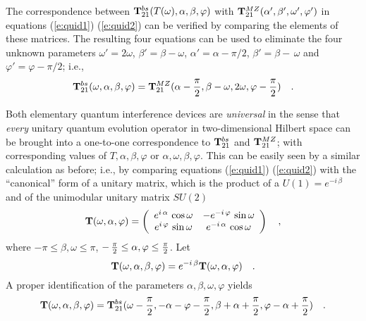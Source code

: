 \documentclass [11pt]{llncs}
\begin{document}
The correspondence between
${\bf T}_{21}^{bs} (T(\omega ),\alpha ,\beta ,\varphi )$ with
${\bf T}_{21}^{MZ} (\alpha ',\beta ',\omega ',\varphi ')$ in equations
(\ref{e:quid1})
(\ref{e:quid2}) can be verified by comparing the elements of these
matrices.
The resulting four equations can be used to eliminate the four unknown
parameters
$\omega '=2\omega $,
$\beta '=\beta -\omega$,
$\alpha '=\alpha -\pi /2$,
$\beta '=\beta -\, \omega$ and
$\varphi '=\varphi -\pi /2$; i.e.,
\begin{equation}
{\bf T}_{21}^{bs} (\omega ,\alpha ,\beta ,\varphi ) =
{\bf T}_{21}^{MZ} (\alpha -{\pi \over 2}, \beta
-\omega ,2\omega
,\varphi
-{\pi \over 2})
\quad .
\end{equation}


Both elementary quantum interference devices are {\em universal} in the
sense that
{\em every} unitary quantum
evolution operator in two-dimensional Hilbert space can be brought into
a one-to-one correspondence to  ${\bf T}^{bs}_{21}$ and
${\bf T}^{MZ}_{21}$; with corresponding values of
$T,\alpha ,\beta ,\varphi$ or
$\alpha ,\omega ,\beta ,\varphi $.
This can be easily seen by a similar calculation as before; i.e., by
comparing
equations
(\ref{e:quid1})
(\ref{e:quid2}) with the ``canonical''  form of a unitary matrix, which
is the product of a $U(1)=e^{-i\,\beta}$ and
 of the unimodular unitary
matrix $SU(2)$ \cite{murnaghan}
\begin{equation}
{\bf T} (\omega ,\alpha ,\varphi )=
\left(
\begin{array}{cc}
{e^{i\,\alpha }}\,\cos \omega
&
{-e^{-i\,\varphi }}\,\sin \omega
\\
{e^{i\,\varphi }}\,\sin \omega
&
{e^{-i\,\alpha }}\,\cos \omega
 \end{array}
\right)
 \quad ,
\end{equation}
where $-\pi \le \beta ,\omega \le \pi$,
$-\, {\pi \over 2} \le  \alpha ,\varphi \le {\pi \over 2}$.
Let
\begin{equation}
{\bf T} (\omega ,\alpha ,\beta ,\varphi )=
e^{-i\,\beta}{\bf T} (\omega ,\alpha ,\varphi )
\quad .
\end{equation}
A proper identification of the parameters
$\alpha ,\beta ,\omega ,\varphi $ yields
\begin{equation}
{\bf T} (\omega ,\alpha ,\beta ,\varphi )=
{\bf T}_{21}^{bs} (\omega -{\pi \over 2} ,-\alpha -\varphi -{\pi \over
2},
\beta + \alpha  +{\pi  \over 2} ,\varphi -\alpha +{\pi \over 2}
)
\quad .
\end{equation}
\end{document}
